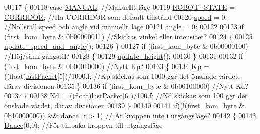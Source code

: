 \begin{DoxyCode}
00117         \{
00118             \textcolor{keywordflow}{case} \hyperlink{styr_2styr_2main_8c_aeb6c30b72b6dd0937e2d45de44322a49a506e8dd29460ea318b68d035f679b01b}{MANUAL}: \textcolor{comment}{//Manuellt läge}
00119             \hyperlink{state__machine_8h_a5e5321a4a9085b83c8161454bf7a145c}{ROBOT\_STATE} = \hyperlink{state__machine_8h_a94b1da2e055fff4d143aa6aa891f79a9af4fc00ebf5a552ca632130e794617d58}{CORRIDOR}; \textcolor{comment}{//Ha CORRIDOR som default-tillstånd}
00120             \hyperlink{styr_2styr_2main_8c_a7f7e4724cf57d59513b39c5ecc81adc8}{speed} = 0; \textcolor{comment}{//Nollställ speed och angle vid manuellt läge}
00121             \hyperlink{styr_2styr_2main_8c_ab8ef1bf8a70cc07c6d55823c390a7e76}{angle} = 0;
00122             
00123             \textcolor{keywordflow}{if} (first\_kom\_byte & 0b00000011) \textcolor{comment}{//Skickas vinkel eller intensitet?}
00124             \{
00125                 \hyperlink{styr_2styr_2main_8c_ac755a97dcfd4c99fc14471a280f28788}{update\_speed\_and\_angle}();
00126             \}
00127             \textcolor{keywordflow}{if} (first\_kom\_byte & 0b00000100) \textcolor{comment}{//Höj/sänk gångstil?}
00128             \{
00129                 \hyperlink{styr_2styr_2main_8c_ae4a2d91f6764f80102bf377fb3686d69}{update\_height}();
00130             \}
00131             
00132             \textcolor{keywordflow}{if} (first\_kom\_byte & 0b00010000) \textcolor{comment}{//Nytt Kp?}
00133             \{
00134                 \hyperlink{state__machine_8h_a09cfc766a233ad617270562cc4146d07}{Kp} = ((float)\hyperlink{styr_2styr_2main_8c_a17b197a501fde4cc8d5475b4adaab464}{lastPacket}[5])/1000.f; \textcolor{comment}{//Kp skickas som 1000 ggr det önskade
       värdet, därav divisionen}
00135             \}
00136             \textcolor{keywordflow}{if} (first\_kom\_byte & 0b00100000) \textcolor{comment}{//Nytt Kd?}
00137             \{
00138                 \hyperlink{state__machine_8h_a98268d71502ba080d88a9b1f50fdbe80}{Kd} = ((float)\hyperlink{styr_2styr_2main_8c_a17b197a501fde4cc8d5475b4adaab464}{lastPacket}[6])/100.f; \textcolor{comment}{//Kd skickas som 100 ggr det önskade värdet,
       därav divisionen}
00139             \}
00140             
00141             \textcolor{keywordflow}{if}((!(first\_kom\_byte & 0b10000000)) && \hyperlink{gangstilar_8h_a53714f6e2fcbc2539af246d0a0446cbe}{dance\_r} > 1)  \textcolor{comment}{// Är kroppen inte i utgångsläge?}
00142             \{
00143                 \hyperlink{gangstilar_8c_a52ff26f8e5f26305582c67be8be4417b}{Dance}(0,0); \textcolor{comment}{//För tillbaka kroppen till utgångsläge}

\end{DoxyCode}
